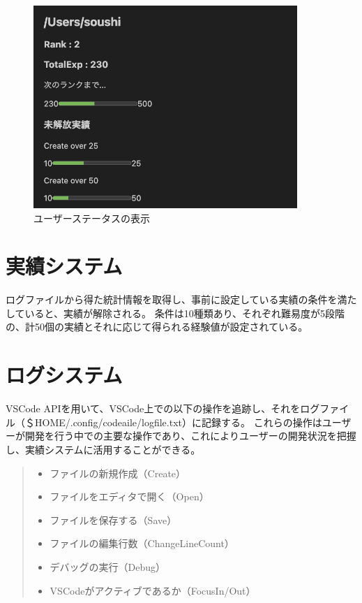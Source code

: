 \documentclass[12pt,twoside]{jbook}
\begin{document}
\begin{figure}[tb]
  \centering
  \includegraphics[width=10cm]{images/userStatus}
  \caption{ユーザーステータスの表示}
  \label{fig:userStatus}
\end{figure}

\section{実績システム}
 ログファイルから得た統計情報を取得し、事前に設定している実績の条件を満たしていると、実績が解除される。
条件は10種類あり、それぞれ難易度が5段階の、計50個の実績とそれに応じて得られる経験値が設定されている。

\section{ログシステム}
 VSCode APIを用いて、VSCode上での以下の操作を追跡し、それをログファイル（＄HOME/.config/codeaile/logfile.txt）に記録する。
 これらの操作はユーザーが開発を行う中での主要な操作であり、これによりユーザーの開発状況を把握し、実績システムに活用することができる。
\begin{quote}
  \begin{itemize}
   \item ファイルの新規作成（Create）
   \item ファイルをエディタで開く（Open）
   \item ファイルを保存する（Save）
   \item ファイルの編集行数（ChangeLineCount）
   \item デバッグの実行（Debug）
   \item VSCodeがアクティブであるか（FocusIn/Out）
  \end{itemize}
\end{quote}
\end{document}
